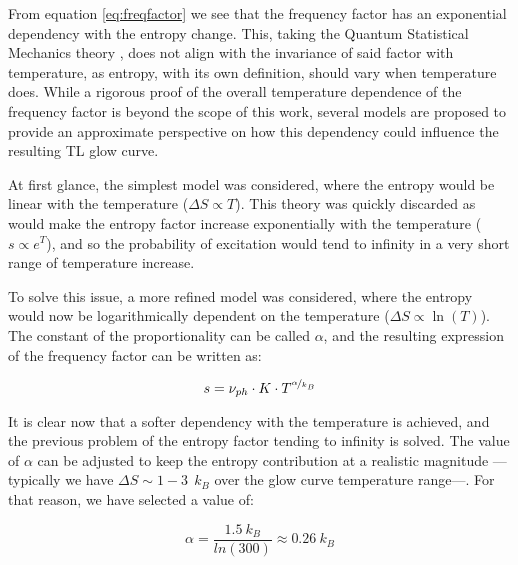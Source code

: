 \vspace{10pt}

From equation \ref{eq:freqfactor} we see that the frequency factor has an exponential dependency with the entropy change. This, taking the Quantum Statistical Mechanics theory \cite{brey}, does not align with the invariance of said factor with temperature, as entropy, with its own definition, should vary when temperature does. While a rigorous proof of the overall temperature dependence of the frequency factor is beyond the scope of this work, several models are proposed to provide an approximate perspective on how this dependency could influence the resulting TL glow curve.

\vspace{10pt}

At first glance, the simplest model was considered, where the entropy would be linear with the temperature ($\Delta S \propto T$). This theory was quickly discarded as would make the entropy factor increase exponentially with the temperature ($s \propto e^T$), and so the probability of excitation would tend to infinity in a very short range of temperature increase.

\vspace{10pt}

To solve this issue, a more refined model was considered, where the entropy would now be logarithmically dependent on the temperature ($\Delta S \propto \ln(T)$). The constant of the proportionality can be called $\alpha$, and the resulting expression of the frequency factor can be written as:

\begin{equation}\label{eq:freqfactor_lnT}
    s = \nu_{ph} \cdot K \cdot T^{\nicefrac{\alpha}{k_B}}
\end{equation}

\vspace{10pt}

It is clear now that a softer dependency with the temperature is achieved, and the previous problem of the entropy factor tending to infinity is solved. The value of $\alpha$ can be adjusted to keep the entropy contribution at a realistic magnitude ---typically we have $\Delta S \sim  1\!-\!3 ~~k_B$ over the glow curve temperature range---. For that reason, we have selected a value of:

\begin{equation}
    \alpha = \frac{1.5 ~k_B}{ln(300)} \approx 0.26 ~k_B
\end{equation}

